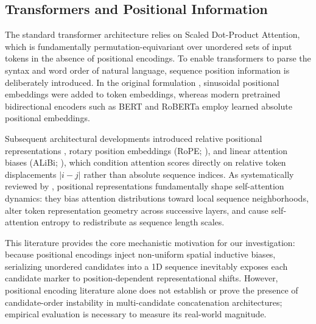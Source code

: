 \documentclass[11pt,a4paper]{article}
\begin{document}
\subsection{Transformers and Positional Information}
The standard transformer architecture \citep{vaswani2017attention} relies on Scaled Dot-Product Attention, which is fundamentally permutation-equivariant over unordered sets of input tokens in the absence of positional encodings. To enable transformers to parse the syntax and word order of natural language, sequence position information is deliberately introduced. In the original formulation \citep{vaswani2017attention}, sinusoidal positional embeddings were added to token embeddings, whereas modern pretrained bidirectional encoders such as BERT and RoBERTa \citep{liu2019roberta} employ learned absolute positional embeddings.

Subsequent architectural developments introduced relative positional representations \citep{shaw2018self}, rotary position embeddings (RoPE; \citealp{su2024roformer}), and linear attention biases (ALiBi; \citealp{press2022alibi}), which condition attention scores directly on relative token displacements $|i - j|$ rather than absolute sequence indices. As systematically reviewed by \citet{dufter2022position}, positional representations fundamentally shape self-attention dynamics: they bias attention distributions toward local sequence neighborhoods, alter token representation geometry across successive layers, and cause self-attention entropy to redistribute as sequence length scales.

This literature provides the core mechanistic motivation for our investigation: because positional encodings inject non-uniform spatial inductive biases, serializing unordered candidates into a 1D sequence inevitably exposes each candidate marker to position-dependent representational shifts. However, positional encoding literature alone does not establish or prove the presence of candidate-order instability in multi-candidate concatenation architectures; empirical evaluation is necessary to measure its real-world magnitude.
\end{document}
